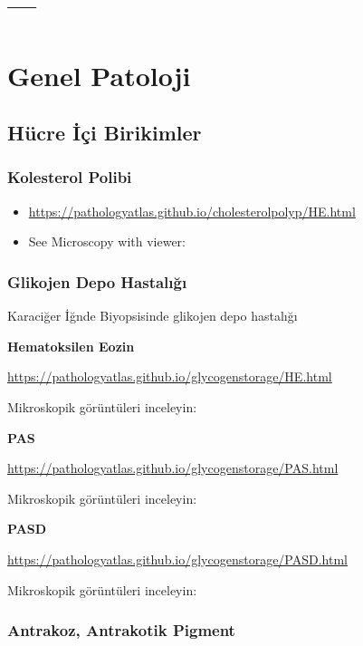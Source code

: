 \documentclass[
  letterpaper,
  DIV=11,
  numbers=noendperiod]{scrreprt}
\begin{document}
\part{---}

\part{Genel Patoloji}

\hypertarget{huxfccre-iuxe7i-birikimler}{%
\chapter{Hücre İçi Birikimler}\label{huxfccre-iuxe7i-birikimler}}

\hypertarget{kolesterol-polibi}{%
\section{Kolesterol Polibi}\label{kolesterol-polibi}}

\begin{itemize}
\item
  \url{https://pathologyatlas.github.io/cholesterolpolyp/HE.html}
\item
  See Microscopy with viewer:
\end{itemize}

\hypertarget{glikojen-depo-hastalux131ux11fux131}{%
\section{Glikojen Depo
Hastalığı}\label{glikojen-depo-hastalux131ux11fux131}}

Karaciğer İğnde Biyopsisinde glikojen depo hastalığı

\textbf{Hematoksilen Eozin}

\url{https://pathologyatlas.github.io/glycogenstorage/HE.html}

Mikroskopik görüntüleri inceleyin:

\textbf{PAS}

\url{https://pathologyatlas.github.io/glycogenstorage/PAS.html}

Mikroskopik görüntüleri inceleyin:

\textbf{PASD}

\url{https://pathologyatlas.github.io/glycogenstorage/PASD.html}

Mikroskopik görüntüleri inceleyin:

\hypertarget{antrakoz-antrakotik-pigment}{%
\section{Antrakoz, Antrakotik
Pigment}\label{antrakoz-antrakotik-pigment}}
\end{document}
